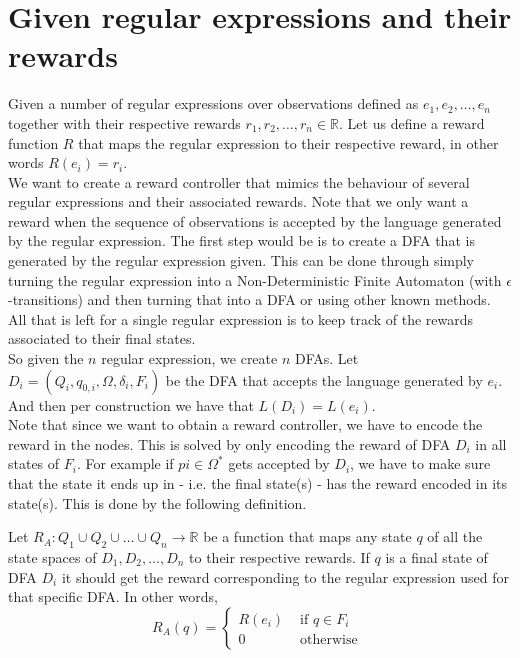 \section{Given regular expressions and their rewards}

Given a number of regular expressions over observations defined as $e_1,e_2,\dots,e_n$ together with their respective rewards $r_1,r_2,\dots,r_n\in\mathbb{R}$. Let us define a reward function $R$ that maps the regular expression to their respective reward, in other words $R(e_i)=r_i$. \\

We want to create a reward controller that mimics the behaviour of several regular expressions and their associated rewards. Note that we only want a reward when the sequence of observations is accepted by the language generated by the regular expression. The first step would be is to create a DFA that is generated by the regular expression given. This can be done through simply turning the regular expression into a Non-Deterministic Finite Automaton (with $\epsilon$-transitions) and then turning that into a DFA or using other known methods\cite{p:regex-to-dfa}. All that is left for a single regular expression is to keep track of the rewards associated to their final states.\\

So given the $n$ regular expression, we create $n$ DFAs. Let $D_i=(Q_i,q_{0,i},\Omega, \delta_i,F_i)$ be the DFA that accepts the language generated by $e_i$. And then per construction we have that $L(D_i)=L(e_i)$. \\

Note that since we want to obtain a reward controller, we have to encode the reward in the nodes. This is solved by only encoding the reward of DFA $D_i$ in all states of $F_i$. For example if $pi\in\Omega^*$ gets accepted by $D_i$, we have to make sure that the state it ends up in - i.e. the final state(s) - has the reward encoded in its state(s). This is done by the following definition.
\begin{definition}
Let $R_A:Q_1\cup Q_2\cup\dots\cup Q_n\to\mathbb{R}$ be a function that maps any state $q$ of all the state spaces of $D_1,D_2,\dots,D_n$ to their respective rewards. If $q$ is a final state of DFA $D_i$ it should get the reward corresponding to the regular expression used for that specific DFA. In other words,
\begin{equation*}
R_A(q) = \begin{cases}
R(e_i) & \text{ if } q\in F_i \\
0 & \text{ otherwise }
\end{cases}
\end{equation*}
\label{d:associated_reward}
\end{definition}

